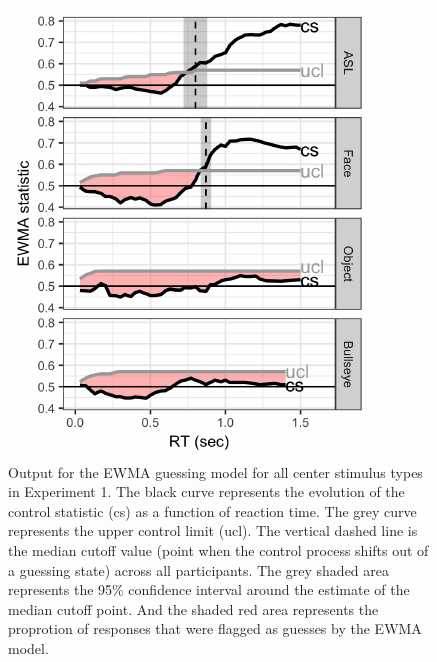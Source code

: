 \documentclass[10pt, letterpaper]{article}
\newenvironment{CodeChunk}{}{}
\begin{document}
\begin{CodeChunk}
\begin{figure}[t]

{\centering \includegraphics{figs/e1_control_chart-1} 

}

\caption[Output for the EWMA guessing model for all center stimulus types in Experiment 1]{Output for the EWMA guessing model for all center stimulus types in Experiment 1. The black curve represents the evolution of the control statistic (cs) as a function of reaction time. The grey curve represents the upper control limit (ucl). The vertical dashed line is the median cutoff value (point when the control process shifts out of a guessing state) across all participants. The grey shaded area represents the 95\% confidence interval around the estimate of the median cutoff point. And the shaded red area represents the proprotion of responses that were flagged as guesses by the EWMA model.}\label{fig:e1_control_chart}
\end{figure}
\end{CodeChunk}
\end{document}
